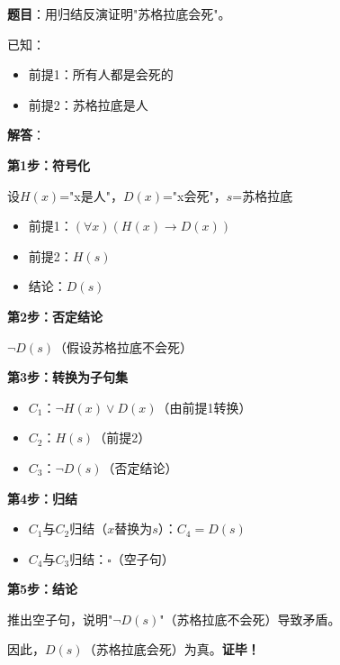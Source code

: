 \begin{examplebox}
\textbf{题目}：用归结反演证明"苏格拉底会死"。

已知：
\begin{itemize}[itemsep=0pt]
    \item 前提1：所有人都是会死的
    \item 前提2：苏格拉底是人
\end{itemize}
\tcblower
\textbf{解答}：

\textbf{第1步：符号化}

设$H(x)$="x是人"，$D(x)$="x会死"，$s$=苏格拉底

\begin{itemize}[itemsep=0pt]
    \item 前提1：$(\forall x)(H(x) \to D(x))$
    \item 前提2：$H(s)$
    \item 结论：$D(s)$
\end{itemize}

\textbf{第2步：否定结论}

$\neg D(s)$（假设苏格拉底不会死）

\textbf{第3步：转换为子句集}
\begin{itemize}[itemsep=0pt]
    \item $C_1$：$\neg H(x) \lor D(x)$（由前提1转换）
    \item $C_2$：$H(s)$（前提2）
    \item $C_3$：$\neg D(s)$（否定结论）
\end{itemize}

\textbf{第4步：归结}

\begin{center}
\end{center}

\begin{itemize}[itemsep=0pt]
    \item $C_1$与$C_2$归结（$x$替换为$s$）：$C_4 = D(s)$
    \item $C_4$与$C_3$归结：$\square$（空子句）
\end{itemize}

\textbf{第5步：结论}

推出空子句，说明"$\neg D(s)$"（苏格拉底不会死）导致矛盾。

因此，$D(s)$（苏格拉底会死）为真。\textbf{证毕！}
\end{examplebox}

